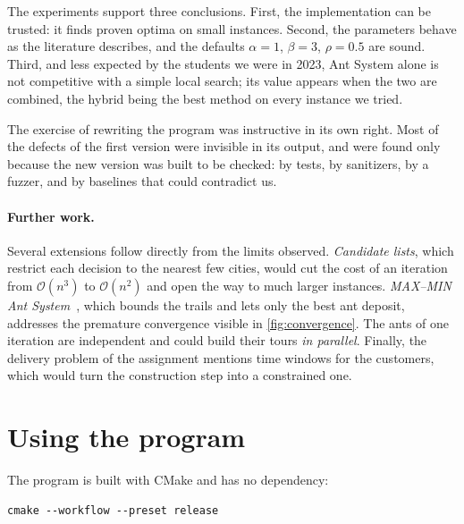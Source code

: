 \documentclass[11pt,a4paper]{article}
\newcommand{\bigO}{\mathcal{O}}
\begin{document}
The experiments support three conclusions. First, the implementation can be trusted: it
finds proven optima on small instances. Second, the parameters behave as the literature
describes, and the defaults $\alpha=1$, $\beta=3$, $\rho=0.5$ are sound. Third, and less
expected by the students we were in 2023, Ant System alone is not competitive with a
simple local search; its value appears when the two are combined, the hybrid being the
best method on every instance we tried.

The exercise of rewriting the program was instructive in its own right. Most of the
defects of the first version were invisible in its output, and were found only because the
new version was built to be checked: by tests, by sanitizers, by a fuzzer, and by baselines
that could contradict us.

\paragraph{Further work.}
Several extensions follow directly from the limits observed.
\emph{Candidate lists}, which restrict each decision to the nearest few cities, would cut
the cost of an iteration from $\bigO(n^3)$ to $\bigO(n^2)$ and open the way to much larger
instances. \emph{MAX--MIN Ant System}~\cite{stutzle2000mmas}, which bounds the trails and
lets only the best ant deposit, addresses the premature convergence visible in
\cref{fig:convergence}. The ants of one iteration are independent and could build their
tours \emph{in parallel}. Finally, the delivery problem of the assignment mentions time
windows for the customers, which would turn the construction step into a constrained one.

{}



\clearpage
\appendix
\section{Using the program}
\label{sec:usage}

The program is built with CMake and has no dependency:

\begin{lstlisting}
cmake --workflow --preset release
\end{lstlisting}
\end{document}

